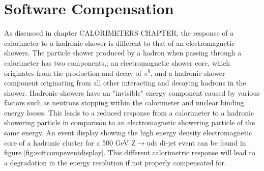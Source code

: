 \section{Software Compensation}
\label{sec:softcomp}
As discussed in chapter CALORIMETERS CHAPTER, the response of a calorimeter to a hadronic shower is different to that of an electromagnetic showers.  The particle shower produced by a hadron when passing through a calorimeter has two components,\cite{Wigmans:2000vf}; an electromagnetic shower core, which originates from the production and decay of $\pi^{0}$, and a hadronic shower component originating from all other interacting and decaying hadrons in the shower.  Hadronic showers have an "invisible" energy component caused by various factors such as neutrons stopping within the calorimeter and nuclear binding energy losses.  This leads to a reduced response from a calorimeter to a hadronic showering particle in comparison to an electromagnetic showering particle of the same energy.  An event display showing the high energy density electromagnetic core of a hadronic cluster for a 500 GeV Z$\rightarrow$uds di-jet event can be found in figure \ref{fig:softcompeventdisplay}.  This different calorimetric response will lead to a degradation in the energy resolution if not properly compensated for.  

